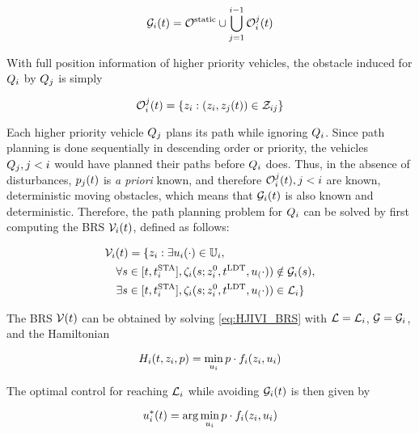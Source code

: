 \begin{equation}
\label{eq:obsseti}
\obsset_i(t)  = \soset \cup \bigcup_{j=1}^{i-1} \ioset_i^j(t)
\end{equation}

With full position information of higher priority vehicles, the obstacle induced for $Q_{i}$ by $Q_{j}$ is simply

\begin{equation}
\label{eq:ioset}
\ioset_i^j(t) = \{\state_i: (\state_i, \state_j(t)) \in \dz_{ij}\}
\end{equation}

Each higher priority vehicle $Q_{j}$ plans its path while ignoring $Q_{i}$. Since path planning is done sequentially in descending order or priority, the vehicles $Q_{j}, j<i$ would have planned their paths before $Q_{i}$ does. Thus, in the absence of disturbances, $p_j(t)$ is \textit{a priori} known, and therefore $\mathcal{O}_i^j(t), j<i$ are known, deterministic moving obstacles, which means that $\mathcal{G}_i(t)$ is also known and deterministic. Therefore, the path planning problem for $Q_{i}$ can be solved by first computing the BRS $\mathcal{V}_i(t)$, defined as follows:

\begin{equation}
\label{eq:BRS_basic}
\begin{aligned}
&\brs_i(t) = \{\state_i: \exists \ctrl_i(\cdot) \in \cfset_i, \\
&\quad\forall s \in [t, \sta_i], \traj_i(s; \state^0_i, \ldt, \ctrl_(\cdot)) \notin \obsset_i(s), \\
&\quad\exists s \in [t, \sta_i], \traj_i(s; \state^0_i, \ldt, \ctrl_(\cdot)) \in \targetset_i\}
\end{aligned}
\end{equation}

The BRS $\mathcal{V}(t)$ can be obtained by solving \eqref{eq:HJIVI_BRS} with $\mathcal{L} = \mathcal{L}_i$, $\mathcal{G} = \mathcal{G}_i$, and the Hamiltonian 

\begin{equation}
\label{eq:basicham}
\ham_i(t, \state_i, p) = \min_{\ctrl_i} p \cdot \fdyn_i(\state_i, \ctrl_i)
\end{equation}

The optimal control for reaching $\mathcal{L}_i$ while avoiding $\mathcal{G}_i(t)$ is then given by

\begin{equation}
\label{eq:basicOptCtrl}
\ctrl_i^*(t) = \arg \min_{\ctrl_i} p \cdot \fdyn_i(\state_i, \ctrl_i)
\end{equation}

